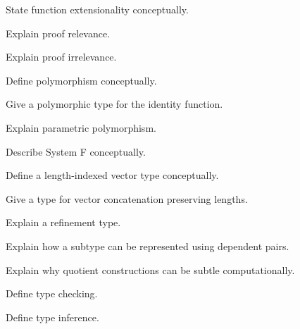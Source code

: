 \begin{exercise}[3]
State function extensionality conceptually.
\end{exercise}

\begin{exercise}[3]
Explain proof relevance.
\end{exercise}

\begin{exercise}[3]
Explain proof irrelevance.
\end{exercise}

\begin{exercise}[2]
Define polymorphism conceptually.
\end{exercise}

\begin{exercise}[3]
Give a polymorphic type for the identity function.
\end{exercise}

\begin{exercise}[3]
Explain parametric polymorphism.
\end{exercise}

\begin{exercise}[3]
Describe System F conceptually.
\end{exercise}

\begin{exercise}[3]
Define a length-indexed vector type conceptually.
\end{exercise}

\begin{exercise}[3]
Give a type for vector concatenation preserving lengths.
\end{exercise}

\begin{exercise}[3]
Explain a refinement type.
\end{exercise}

\begin{exercise}[3]
Explain how a subtype can be represented using dependent pairs.
\end{exercise}

\begin{exercise}[3]
Explain why quotient constructions can be subtle computationally.
\end{exercise}

\begin{exercise}[2]
Define type checking.
\end{exercise}

\begin{exercise}[2]
Define type inference.
\end{exercise}

